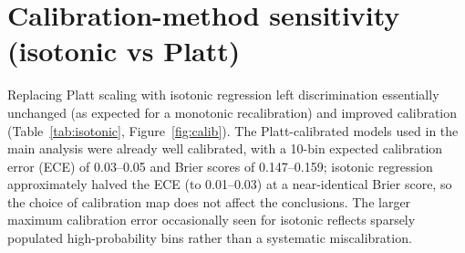 \documentclass[11pt]{article}
\begin{document}
\section{Calibration-method sensitivity (isotonic vs Platt)}
\label{app:isotonic}

Replacing Platt scaling with isotonic regression left discrimination essentially
unchanged (as expected for a monotonic recalibration) and improved calibration
(Table~\ref{tab:isotonic}, Figure~\ref{fig:calib}). The Platt-calibrated models used
in the main analysis were already well calibrated, with a 10-bin expected calibration
error (ECE) of 0.03--0.05 and Brier scores of 0.147--0.159; isotonic regression
approximately halved the ECE (to 0.01--0.03) at a near-identical Brier score, so the
choice of calibration map does not affect the conclusions. The larger maximum
calibration error occasionally seen for isotonic reflects sparsely populated
high-probability bins rather than a systematic miscalibration.

\begin{table}[htbp]
\centering
\caption{Calibration-method sensitivity (full cohort $n=1500$, classical models):
pooled out-of-fold AUROC, Brier score, and 10-bin expected calibration error (ECE)
under Platt and isotonic recalibration. Lower Brier and ECE are better.}
\label{tab:isotonic}
\end{table}
\end{document}
